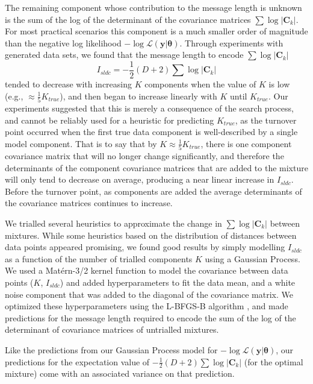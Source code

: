 \documentclass{elsarticle}
\newcommand{\vect}[1]{\boldsymbol{\mathbf{#1}}}
\def\cov{C}
\def\veccov{\vect{\cov}}
\def\vectheta{\vect{\theta}}
\def\datum{y}
\def\data{\vect{\datum}}
\begin{document}
The remaining component whose contribution to the message length is unknown is the sum of
the log of the determinant of the covariance matrices $\sum\log|\veccov_k|$. For most
practical scenarios this component is a much smaller order of magnitude than the negative
log likelihood $-\log{\mathcal{L}(\data|\vectheta)}$. Through experiments with generated
data sets, we found that the message length to encode $\sum\log|\veccov_k|$
\begin{equation}
	I_{sldc} = -\frac{1}{2}(D + 2)\sum\log|\veccov_k|
\end{equation}
\noindent{}tended to decrease with increasing $K$ components when the value of $K$ is low
(e.g., $\approx \frac{1}{5}K_{true}$), and then began to increase linearly with $K$ until
$K_{true}$. Our experiments suggested that this is merely a consequence of the search
process, and cannot be reliably used for a heuristic for predicting $K_{true}$, as the
turnover point occurred when the first true data component is well-described by a single
model component. That is to say that by $K \approx \frac{1}{5}K_{true}$, there is one
component covariance matrix that will no longer change significantly, and therefore the
determinants of the component covariance matrices that are added to the mixture will only
tend to decrease on average, producing a near linear increase in $I_{sldc}$. Before the
turnover point, as components are added the average determinants of the covariance matrices
continues to increase.

We trialled several heuristics to approximate the change in $\sum\log|\veccov_k|$ between
mixtures. While some heuristics based on the distribution of distances between data points
appeared promising, we found good results by simply modelling $I_{sldc}$ as a function
of the number of trialled components $K$ using a Gaussian Process. We used a Mat\'ern-3/2
kernel \citep{matern,GPs} function to model the covariance between data points ($K$, $I_{sldc}$) and added
hyperparameters to fit the data mean, and a white noise component that was added to the
diagonal of the covariance matrix. We optimized these hyperparameters using the L-BFGS-B
algorithm \citep{bfgs,scipy,george}, and made predictions for the message length required
to encode the sum of the log of the determinant of covariance matrices of untrialled
mixtures.

Like the predictions from our Gaussian Process model for $-\log{\mathcal{L}(\data|\vectheta)}$,
our predictions for the expectation value of $-\frac{1}{2}(D + 2)\sum\log|\veccov_k|$ (for
the optimal mixture) come with an associated variance on that prediction.
\end{document}
